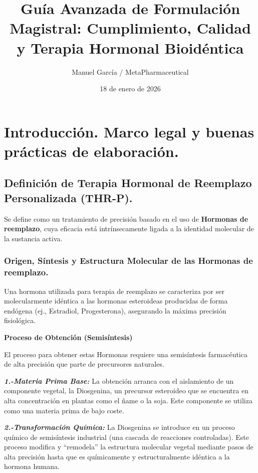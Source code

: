 \documentclass[
  spanish,
]{article}
\title{Guía Avanzada de Formulación Magistral: Cumplimiento, Calidad y Terapia Hormonal Bioidéntica}
\author{Manuel García / MetaPharmaceutical}
\date{18 de enero de 2026}
\begin{document}
\maketitle

{
\setcounter{tocdepth}{3}
\tableofcontents
}
\section{Introducción. Marco legal y buenas prácticas de elaboración.}\label{introducciuxf3n.-marco-legal-y-buenas-pruxe1cticas-de-elaboraciuxf3n.}

\subsection{Definición de Terapia Hormonal de Reemplazo Personalizada (THR-P).}\label{definiciuxf3n-de-terapia-hormonal-de-reemplazo-personalizada-thr-p.}

Se define como un tratamiento de precisión basado en el uso de \textbf{Hormonas de reemplazo}, cuya eficacia está intrínsecamente ligada a la identidad molecular de la sustancia activa.

\subsubsection{Origen, Síntesis y Estructura Molecular de las Hormonas de reemplazo.}\label{origen-suxedntesis-y-estructura-molecular-de-las-hormonas-de-reemplazo.}

Una hormona utilizada para terapia de reemplazo se caracteriza por ser molecularmente idéntica a las hormonas esteroideas producidas de forma endógena (ej., Estradiol, Progesterona), asegurando la máxima precisión fisiológica.

\textbf{Proceso de Obtención (Semisíntesis)}

El proceso para obtener estas Hormonas requiere una semisíntesis farmacéutica de alta precisión que parte de precursores naturales.

\textbf{\emph{1.-Materia Prima Base:}} La obtención arranca con el aislamiento de un componente vegetal, la Diosgenina, un precursor esteroideo que se encuentra en alta concentración en plantas como el ñame o la soja. Este componente se utiliza como una materia prima de bajo coste.

\textbf{\emph{2.-Transformación Química:}} La Diosgenina se introduce en un proceso químico de semisíntesis industrial (una cascada de reacciones controladas). Este proceso modifica y ``remodela'' la estructura molecular vegetal mediante pasos de alta precisión hasta que es químicamente y estructuralmente idéntica a la hormona humana.
\end{document}
